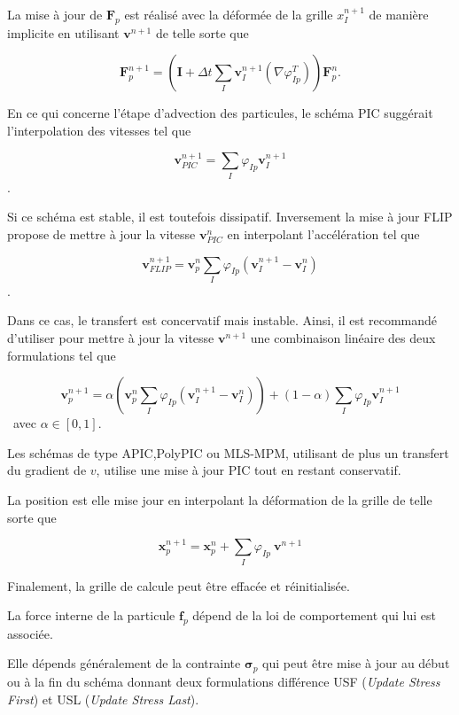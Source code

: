 La mise à jour de $\bm F_p$ est réalisé avec la déformée de la grille $ x_I^{n+1}$ de manière implicite en utilisant $\bm v^{n+1}$ de telle sorte que

\begin{equation*}
    \bm F_p^{n+1} = \left( \bm I + \Delta t \sum_I \bm v_I^{n+1} (\nabla \varphi_{Ip}^T)\right) \bm  F_p^{n}.
\end{equation*}

En ce qui concerne l'étape d'advection des particules, le schéma PIC suggérait l'interpolation des vitesses tel que

\begin{equation*}
    \bm v_{PIC}^{n+1} = \sum_I \varphi_{Ip} \bm v_I^{n+1}
\end{equation*}.

Si ce schéma est stable, il est toutefois dissipatif. Inversement la mise à jour FLIP propose de mettre à jour la vitesse $\bm v_{PIC}^{n}$ en interpolant l'accélération tel que

\begin{equation*}
    \bm v_{FLIP}^{n+1} = \bm v_{p}^{n} \sum_I \varphi_{Ip} (\bm v_I^{n+1} - \bm v_I^{n})
\end{equation*}.

Dans ce cas, le transfert est concervatif mais instable. Ainsi, il est recommandé d'utiliser pour mettre à jour la vitesse $\bm v^{n+1}$ une combinaison linéaire des deux formulations tel que

\begin{equation*}
    \bm v_{p}^{n+1} = \alpha \left(\bm v_{p}^{n} \sum_I \varphi_{Ip} (\bm v_I^{n+1} - \bm v_I^{n})\right) + (1- \alpha)\sum_I \varphi_{Ip} \bm v_I^{n+1}
\end{equation*}~avec $\alpha \in [0, 1]$.

Les schémas de type APIC,PolyPIC ou MLS-MPM, utilisant de plus un transfert du gradient de $v$, utilise une mise à jour PIC tout en restant conservatif.

La position est elle mise jour en interpolant la déformation de la grille de telle sorte que

\begin{equation*}
    \bm x_p^{n+1} = \bm x_p^{n} + \sum_I \varphi_{Ip}~\bm v^{n+1}
\end{equation*}

Finalement, la grille de calcule peut être effacée et réinitialisée.

La force interne de la particule $\bm f_p$ dépend de la loi de comportement qui lui est associée.

Elle dépends généralement de la contrainte $\bm \sigma_p$ qui peut être mise à jour au début ou à la fin du schéma donnant deux formulations différence USF (\textit{Update Stress First}) et USL (\textit{Update Stress Last}).